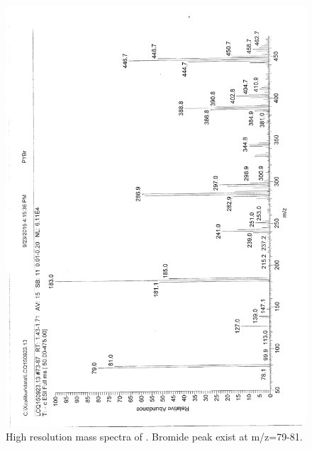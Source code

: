 \documentclass[journal=jacsat,manuscript=article]{achemso}
\begin{document}
\begin{figure}
\includegraphics[height=\textheight-2\baselineskip]{mass_PPyBr.png}
\caption{High resolution mass spectra of . Bromide peak exist at m/z=79-81.}
\end{figure}
\end{document}
